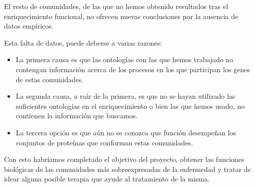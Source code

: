 El resto de comunidades, de las que no hemos obtenido resultados tras el enriquecimiento funcional, no ofrecen nuevas conclusiones por la ausencia de datos empíricos. 

Esta falta de datos, puede deberse a varias razones:

\begin{itemize}
	\item La primera causa es que las ontologías con las que hemos trabajado no contengan información acerca de los procesos en los que participan los genes de estas comunidades.
	
	\item La segunda causa, a raíz de la primera, es que no se hayan utilizado las suficientes ontologías en el enriquecimiento o bien las que hemos usado, no contienen la información que buscamos.
	
	\item La tercera opción es que aún no se conozca que función desempeñan los conjuntos de proteínas que conforman estas comunidades.
\end{itemize}

Con esto habríamos completado el objetivo del proyecto, obtener las funciones biológicas de las comunidades más sobreexpresadas de la enfermedad y tratar de idear alguna posible terapia que ayude al tratamiento de la misma.
